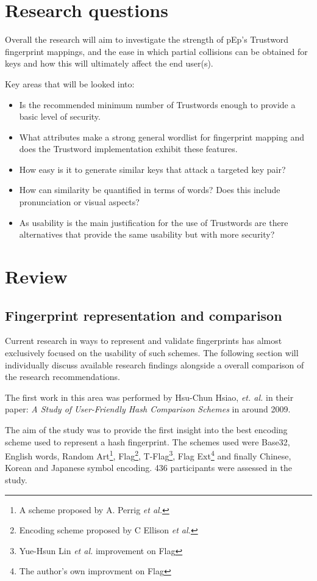 \section{Research questions}

Overall the research will aim to investigate the strength of pEp's Trustword fingerprint mappings, and the ease in which partial collisions can be obtained for keys and how this will ultimately affect the end user(s).

Key areas that will be looked into:
\begin{itemize}
    \item Is the recommended minimum number of Trustwords enough to provide a basic level of security.
    \item What attributes make a strong general wordlist for fingerprint mapping and does the Trustword implementation exhibit these features.
    \item How easy is it to generate similar keys that attack a targeted key pair?
    \item How can similarity be quantified in terms of words? Does this include pronunciation or visual aspects?
    \item As usability is the main justification for the use of Trustwords are there alternatives that provide the same usability but with more security?
\end{itemize}

\section{Review}

\subsection{Fingerprint representation and comparison}

Current research in ways to represent and validate fingerprints has almost exclusively focused on the usability of such schemes. The following section will individually discuss available research findings alongside a overall comparison of the research recommendations.

The first work in this area was performed by Hsu-Chun Hsiao, \textit{et. al.} in their paper: \textit{A Study of User-Friendly Hash Comparison Schemes}\cite{hsiao2009study} in around 2009.

The aim of the study was to provide the first insight into the best encoding scheme used to represent a hash fingerprint. The schemes used were Base32, English words, Random Art\footnote{A scheme proposed by A. Perrig \textit{et al.}\cite{perrig1999hash}}, Flag\footnote{Encoding scheme proposed by C Ellison \textit{et al.}\cite{ellison2003public}}, T-Flag\footnote{Yue-Hsun Lin \textit{et al.}\cite{lin2010spate} improvement on Flag}, Flag Ext\footnote{The author's own improvment on Flag} and finally Chinese, Korean and Japanese symbol encoding. 436 participants were assessed in the study.

